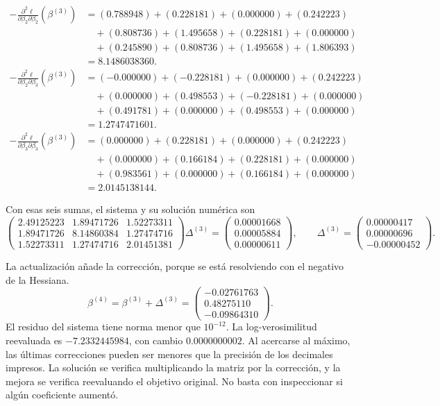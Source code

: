 \documentclass[11pt,a4paper]{article}
\begin{document}
\[
\begin{aligned}
-\frac{\partial^2\ell}{\partial\beta_2\partial\beta_2}(\beta^{(3)})&=(0.788948)+(0.228181)+(0.000000)+(0.242223)\\&\quad+(0.808736)+(1.495658)+(0.228181)+(0.000000)\\&\quad+(0.245890)+(0.808736)+(1.495658)+(1.806393)\\&=8.1486038360.\end{aligned}
\]
\[
\begin{aligned}
-\frac{\partial^2\ell}{\partial\beta_2\partial\beta_3}(\beta^{(3)})&=(-0.000000)+(-0.228181)+(0.000000)+(0.242223)\\&\quad+(0.000000)+(0.498553)+(-0.228181)+(0.000000)\\&\quad+(0.491781)+(0.000000)+(0.498553)+(0.000000)\\&=1.2747471601.\end{aligned}
\]
\[
\begin{aligned}
-\frac{\partial^2\ell}{\partial\beta_3\partial\beta_3}(\beta^{(3)})&=(0.000000)+(0.228181)+(0.000000)+(0.242223)\\&\quad+(0.000000)+(0.166184)+(0.228181)+(0.000000)\\&\quad+(0.983561)+(0.000000)+(0.166184)+(0.000000)\\&=2.0145138144.\end{aligned}
\]

Con esas seis sumas, el sistema y su solución numérica son
\[
\begin{pmatrix}2.49125223&1.89471726&1.52273311\\1.89471726&8.14860384&1.27474716\\1.52273311&1.27474716&2.01451381\end{pmatrix}\Delta^{(3)}=\begin{pmatrix}0.00001668\\0.00005884\\0.00000611\end{pmatrix},\qquad\Delta^{(3)}=\begin{pmatrix}0.00000417\\0.00000696\\-0.00000452\end{pmatrix}.
\]

La actualización añade la corrección, porque se está resolviendo
con el negativo de la Hessiana.
\[
\beta^{(4)}=\beta^{(3)}+\Delta^{(3)}=\begin{pmatrix}-0.02761763\\0.48275110\\-0.09864310\end{pmatrix}.
\]
El residuo del sistema tiene norma menor que \(10^{-12}\). La log-verosimilitud reevaluada es \(-7.2332445984\), con cambio \(0.0000000002\). 
Al acercarse al máximo, las últimas correcciones pueden ser
menores que la precisión de los decimales impresos.
La solución se verifica multiplicando la matriz por la corrección,
y la mejora se verifica reevaluando el objetivo original.
No basta con inspeccionar si algún coeficiente aumentó.
\endgroup
\end{document}

